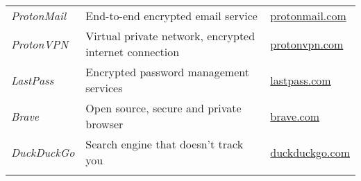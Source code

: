 \begin{landscape}
\begin{longtable}{lll}
\textit{ProtonMail}    & End-to-end encrypted email service           &             \href{https://www.protonmail.com}{protonmail.com}\\ 
\textit{ProtonVPN}      & Virtual private network, encrypted internet connection &  \href{https://www.protonvpn.com}{protonvpn.com}\\
\textit{LastPass}   & Encrypted password management services  &                     \href{https://www.lastpass.com}{lastpass.com}\\
\textit{Brave}       & Open source, secure and private browser  &	                \href{https://www.brave.com}{brave.com}\\
\textit{DuckDuckGo} & Search engine that doesn't track you &                        \href{https://www.duckduckgo.com}{duckduckgo.com}\\


\label{tab:security_tools}

\end{longtable}


\end{landscape}
